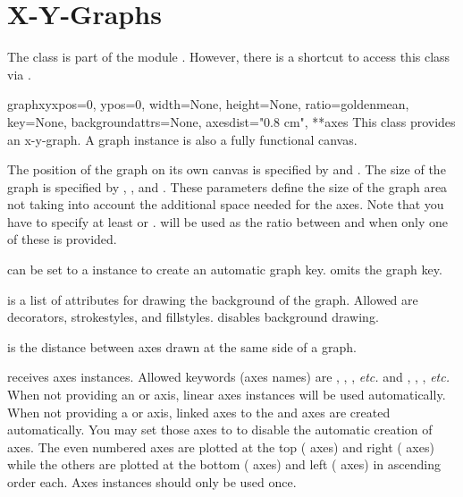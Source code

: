 \section{X-Y-Graphs\label{graph:graph}}


The class  is part of the module .
However, there is a shortcut to access this class via
.

\begin{classdesc}{graphxy}{xpos=0, ypos=0, width=None, height=None,
ratio=goldenmean, key=None, backgroundattrs=None, axesdist="0.8 cm",
**axes}
  This class provides an x-y-graph. A graph instance is also a fully
  functional canvas.

  The position of the graph on its own canvas is specified by
   and . The size of the graph is specified by
  , , and . These parameters define
  the size of the graph area not taking into account the additional
  space needed for the axes. Note that you have to specify at least
   or .  will be used as the ratio
  between  and  when only one of these is
  provided.

   can be set to a  instance to create
  an automatic graph key.  omits the graph key.

   is a list of attributes for drawing the
  background of the graph. Allowed are decorators, strokestyles, and
  fillstyles.  disables background drawing.

   is the distance between axes drawn at the same side
  of a graph.

   receives axes instances. Allowed keywords (axes names)
  are , , , \emph{etc.} and ,
  , , \emph{etc.} When not providing an  or
   axis, linear axes instances will be used automatically.
  When not providing a  or  axis, linked axes to the
   and  axes are created automatically. You may set
  those axes to  to disable the automatic creation of axes.
  The even numbered axes are plotted at the top ( axes) and
  right ( axes) while the others are plotted at the bottom
  ( axes) and left ( axes) in ascending order each.
  Axes instances should only be used once.
\end{classdesc}

